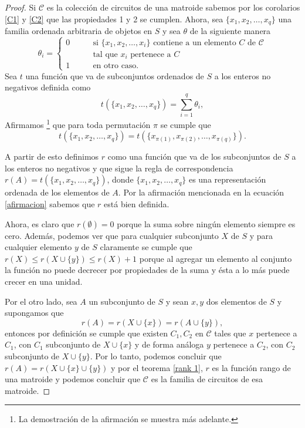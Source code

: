 \begin{proof}
Si $\mathcal{C}$ es la colección de circuitos de una matroide sabemos por los corolarios \ref{C1} y \ref{C2} que las propiedades 1 y 2 se cumplen. 
Ahora, sea $\{x_1,x_2,\dots,x_q\}$ una familia ordenada arbitraria de objetos en $S$ y sea $\theta$ de la siguiente manera 
$$\theta_{i}= 
\begin{cases}
0 & \qquad \text{si $\{x_1,x_2,\dots,x_i\}$ contiene a un elemento $C$ de $\mathcal{C}$} \\
& \qquad \text{tal que $x_i$ pertenece a $C$} \\
1 &\qquad\text{en otro caso.} 
\end{cases} $$
Sea $t$ una función que va de subconjuntos ordenados de $S$ a los enteros no negativos definida como 
\begin{equation} \label{funcic}
t(\{x_1,x_2,\dots,x_q\}) = \sum_{i=1}^{q}\theta_i,
\end{equation}
Afirmamos \footnote{La demostración de la afirmación se muestra más adelante.} que para toda permutación $\pi$ se cumple que 
\begin{equation} \label{afirmacion}
t(\{x_1,x_2,\dots,x_q\}) = t(\{x_{\pi(1)},x_{\pi(2)},\dots,x_{\pi(q)}\}).
\end{equation}


A partir de esto definimos $r$ como una función que va de los subconjuntos de $S$ a los enteros no negativos y que sigue la regla de correspondencia $r(A) = t(\{x_1,x_2,\dots,x_q\})$, donde $\{x_1,x_2,\dots,x_q\}$ es una representación ordenada de los elementos de $A$. Por la afirmación mencionada en la ecuación \ref{afirmacion} sabemos que $r$ está bien definida. 

Ahora, es claro que $r(\emptyset)=0$ porque la suma sobre ningún elemento siempre es cero. Además, podemos ver que para cualquier subconjunto $X$ de $S$ y para cualquier elemento $y$ de $S$ claramente se cumple que $r(X)\leq r(X \cup \{y\}) \leq r(X) + 1$ porque al agregar un elemento al conjunto la función no puede decrecer por propiedades de la suma y ésta a lo más puede crecer en una unidad. 

Por el otro lado, sea $A$ un subconjunto de $S$ y sean $x,y$ dos elementos de $S$ y supongamos que 
$$r(A)= r(X \cup \{x\}) = r(A \cup \{y\}),$$
entonces por definición se cumple que existen $C_1,C_2$ en $\mathcal{C}$ tales que $x$ pertenece a $C_1$, con $C_1$ subconjunto de $X \cup \{x\}$ y de forma análoga $y$ pertenece a $C_2$, con $C_2$ subconjunto de $X \cup \{y\}$. Por lo tanto, podemos concluir que $r(A)= r(X \cup \{x\} \cup \{y\})$ y por el teorema \ref{rank 1}, $r$ es la función rango de una matroide y podemos concluir que $\mathcal{C}$ es la familia de circuitos de esa matroide.
\end{proof}

